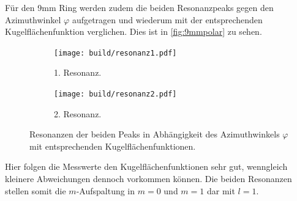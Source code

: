 Für den 9\;mm Ring werden zudem die beiden Resonanzpeaks gegen den Azimuthwinkel $\varphi$ aufgetragen 
und wiederum mit der entsprechenden Kugelflächenfunktion verglichen. Dies ist in \autoref{fig:9mmpolar}
zu sehen.
\begin{figure}
    \centering
    \begin{subfigure}[b]{0.48\textwidth}
        \centering
        \texttt{[image: build/resonanz1.pdf]}
        \caption{1. Resonanz.}
    \end{subfigure}
    \hfill
    \begin{subfigure}[b]{0.48\textwidth}
        \centering
        \texttt{[image: build/resonanz2.pdf]}
        \caption{2. Resonanz.}
    \end{subfigure}
    \hfill
    \caption{Resonanzen der beiden Peaks in Abhängigkeit des Azimuthwinkels $\varphi$ mit entsprechenden Kugelflächenfunktionen.}
    \label{fig:9mmpolar}
\end{figure}
Hier folgen die Messwerte den Kugelflächenfunktionen sehr gut, wenngleich kleinere Abweichungen dennoch
vorkommen können. Die beiden Resonanzen stellen somit die $m$-Aufspaltung in $m = 0$ und $m = 1$ dar mit 
$l = 1$. 

